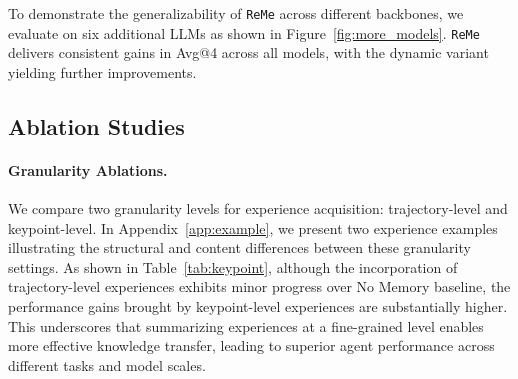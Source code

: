 \documentclass[11pt]{article}
\newcommand{\ours}{\texttt{ReMe}}
\begin{document}
To demonstrate the generalizability of {\ours} across different backbones, we evaluate on six additional LLMs as shown in Figure~\ref{fig:more_models}. {\ours} delivers consistent gains in Avg@4 across all models, with the dynamic variant yielding further improvements. 

\subsection{Ablation Studies}\label{sec:ablation}
\paragraph{Granularity Ablations.} 
We compare two granularity levels for experience  acquisition: trajectory-level and keypoint-level. 
In Appendix~\ref{app:example}, we present two experience examples illustrating the structural and content differences between these granularity settings. 
As shown in Table~\ref{tab:keypoint}, although the incorporation of trajectory-level experiences exhibits minor progress over No Memory baseline, the performance gains brought by keypoint-level experiences are substantially higher. 
This underscores that summarizing experiences at a fine-grained level enables more effective knowledge transfer, leading to superior agent performance across different tasks and model scales. 

\begin{table}[tbp]
    \centering
    \setlength\tabcolsep{4pt}
    \caption{Ablation on key components. We compare the full addition and selective addition and assess the impact of failure-aware reflection and utility-based deletion. A checkmark (\checkmark) indicates the component is used. }\label{tab:component_ablation}
\end{table}
\end{document}
